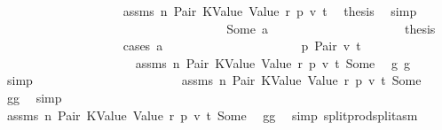 \begin{isabellebody}
\ \ \ \ \ \ \ \ \ \ \ \ \ \ \ \ \ \ \isamarkupfalse%
\ assms\ n\ Pair\ KValue\ Value\ r{}\ p{}\ v{}\ t{}\ \isamarkupfalse%
\ {\isacharquery}{\kern0pt}thesis\ \isamarkupfalse%
\ simp\isanewline
\ \ \ \ \ \ \ \ \ \ \ \ \ \ \ \ \isamarkupfalse%
\isanewline
\ \ \ \ \ \ \ \ \ \ \ \ \ \ \ \ \ \ \isamarkupfalse%
\ {\isacharparenleft}{\kern0pt}Some\ a{\isacharprime}{\kern0pt}{\isacharprime}{\kern0pt}{\isacharparenright}{\kern0pt}\isanewline
\ \ \ \ \ \ \ \ \ \ \ \ \ \ \ \ \ \ \isamarkupfalse%
\ \isamarkupfalse%
\ {\isacharquery}{\kern0pt}thesis\isanewline
\ \ \ \ \ \ \ \ \ \ \ \ \ \ \ \ \ \ \isamarkupfalse%
\ {\isacharparenleft}{\kern0pt}cases\ a{\isacharprime}{\kern0pt}{\isacharprime}{\kern0pt}{\isacharparenright}{\kern0pt}\isanewline
\ \ \ \ \ \ \ \ \ \ \ \ \ \ \ \ \ \ \ \ \isamarkupfalse%
\ p{}{\isacharcolon}{\kern0pt}\ {\isacharparenleft}{\kern0pt}Pair\ v\ t{\isacharparenright}{\kern0pt}\isanewline
\ \ \ \ \ \ \ \ \ \ \ \ \ \ \ \ \ \ \ \ \isamarkupfalse%
\ assms\ n\ Pair\ KValue\ Value\ r{}\ p{}\ v{}\ t{}\ Some\ \isamarkupfalse%
\ {\isachardoublequoteopen}g{}{\isacharprime}{\kern0pt}{\isasymle}\ g{\isachardoublequoteclose}\ \isamarkupfalse%
\ simp\isanewline
\ \ \ \ \ \ \ \ \ \ \ \ \ \ \ \ \ \ \ \ \isamarkupfalse%
\ \isamarkupfalse%
\ assms\ n\ Pair\ KValue\ Value\ r{}\ p{}\ v{}\ t{}\ Some\ \isamarkupfalse%
\ {\isachardoublequoteopen}g{}{\isacharprime}{\kern0pt}{\isacharprime}{\kern0pt}{\isasymle}g{}{\isacharprime}{\kern0pt}{\isachardoublequoteclose}\ \isamarkupfalse%
\ simp\isanewline
\ \ \ \ \ \ \ \ \ \ \ \ \ \ \ \ \ \ \ \ \isamarkupfalse%
\ \isamarkupfalse%
\ assms\ n\ Pair\ KValue\ Value\ r{}\ p{}\ v{}\ t{}\ Some\ \isamarkupfalse%
\ {\isachardoublequoteopen}g{\isacharprime}{\kern0pt}{\isacharequal}{\kern0pt}g{}{\isacharprime}{\kern0pt}{\isacharprime}{\kern0pt}{\isachardoublequoteclose}\ \isamarkupfalse%
\ {\isacharparenleft}{\kern0pt}simp\ split{\isacharcolon}{\kern0pt}prod{\isachardot}{\kern0pt}split{\isacharunderscore}{\kern0pt}asm{\isacharparenright}{\kern0pt}\isanewline

\end{isabellebody}
